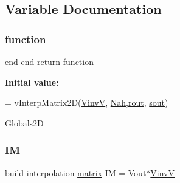 \subsection{Variable Documentation}
\mbox{\label{a00560_a42f883f7468418833529079bc0ce70a5}} 
\subsubsection{\texorpdfstring{function}{function}}
{\footnotesize\ttfamily \hyperlink{a00608_afb358f48b1646c750fb9da6c6585be2b}{end} \hyperlink{a00608_afb358f48b1646c750fb9da6c6585be2b}{end} return function}

{\bfseries Initial value\+:}
\begin{DoxyCode}
= vInterpMatrix2D(\hyperlink{a00473_a8ef32285093ff36729ef70bb1e8149c4}{VinvV}, \hyperlink{a00473_ab1f1cc1af4dcd6977ad6edb607b3d704}{Nah},\hyperlink{a00563_a2428903c9f57e3eba1ab8aa2ea4ad70b}{rout}, \hyperlink{a00563_a2e91fc640c0a9feaa4cd6fa858ba430b}{sout})


Globals2D
\end{DoxyCode}
\mbox{\label{a00560_a89faba2a84f07492f38e3ca6b80e84c7}} 
\subsubsection{\texorpdfstring{IM}{IM}}
{\footnotesize\ttfamily build interpolation \hyperlink{a01014_af07ff1035f34d77764ff516f110e6832}{matrix} IM = Vout$\ast$\hyperlink{a00473_a8ef32285093ff36729ef70bb1e8149c4}{VinvV}}

